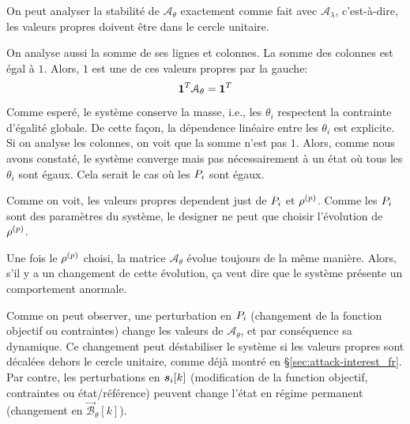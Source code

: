 \documentclass[../main.tex]{subfiles}
\begin{document}
On peut analyser la stabilité de $\mathcal{A}_{\theta}$ exactement comme fait avec $\mathcal{A}_{\lambda}$, c'est-à-dire, les valeurs propres doivent être dans le cercle unitaire.

On analyse aussi la somme de ses lignes et colonnes.
La somme des colonnes est égal à $1$.
Alors, $1$ est une de ces valeurs propres par la gauche:
\begin{equation}
  \label{eq:1}
  \mathbf{1}^{T}\mathcal{A}_{\theta}=\mathbf{1}^{T}
\end{equation}
Comme esperé, le système conserve la masse, i.e., les $\theta_{i}$ respectent la contrainte d'égalité globale.
De cette façon, la dépendence linéaire entre les $\theta_{i}$ est explicite.
Si on analyse les colonnes, on voit que la somme n'est pas $1$.
Alors, comme nous avons constaté, le système converge mais pas nécessairement à un état où tous les $\theta_{i}$ sont égaux.
Cela serait le cas où les ${P}_{i}$ sont égaux.

Comme on voit, les valeurs propres dependent just de ${P}_{i}$ et $\rho^{(p)}$.
Comme les ${P}_{i}$ sont des paramètres du système, le designer ne peut que choisir l'évolution de $\rho^{(p)}$.

Une fois le $\rho^{(p)}$ choisi, la matrice $\mathcal{A}_{\theta}$ évolue toujours de la même manière.
Alors, s'il y a un changement de cette évolution, ça veut dire que le système présente un comportement anormale.

Comme on peut observer, une perturbation en ${P}_{i}$ (changement de la fonction objectif ou contraintes) change les valeurs de $\mathcal{A}_{\theta}$, et par conséquence sa dynamique.
Ce changement peut déstabiliser le système si les valeurs propres sont décalées dehors le cercle unitaire, comme déjà montré en \S\ref{sec:attack-interest_fr}.
Par contre, les perturbations en $\boldsymbol{s}_{i}[k]$ (modification de la function objectif, contraintes ou état/référence) peuvent change l'état en régime permanent (changement en $\mathcal{\vec{B}}_{\theta}[k]$).
\end{document}
